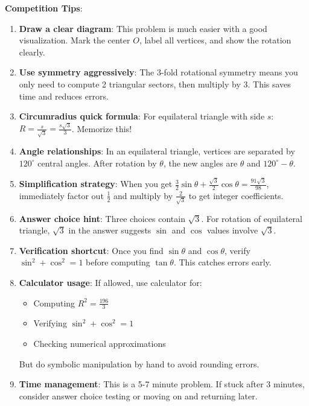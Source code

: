 \documentclass[12pt]{article}
\begin{document}
\begin{tipbox}
\textbf{Competition Tips}:

\begin{enumerate}
    \item \textbf{Draw a clear diagram}: This problem is much easier with a good visualization. Mark the center $O$, label all vertices, and show the rotation clearly.
    
    \item \textbf{Use symmetry aggressively}: The 3-fold rotational symmetry means you only need to compute 2 triangular sectors, then multiply by 3. This saves time and reduces errors.
    
    \item \textbf{Circumradius quick formula}: For equilateral triangle with side $s$: $R = \frac{s}{\sqrt{3}} = \frac{s\sqrt{3}}{3}$. Memorize this!
    
    \item \textbf{Angle relationships}: In an equilateral triangle, vertices are separated by $120^{\circ}$ central angles. After rotation by $\theta$, the new angles are $\theta$ and $120^{\circ} - \theta$.
    
    \item \textbf{Simplification strategy}: When you get $\frac{3}{2}\sin\theta + \frac{\sqrt{3}}{2}\cos\theta = \frac{91\sqrt{3}}{98}$, immediately factor out $\frac{1}{2}$ and multiply by $\frac{2}{\sqrt{3}}$ to get integer coefficients.
    
    \item \textbf{Answer choice hint}: Three choices contain $\sqrt{3}$. For rotation of equilateral triangle, $\sqrt{3}$ in the answer suggests $\sin$ and $\cos$ values involve $\sqrt{3}$.
    
    \item \textbf{Verification shortcut}: Once you find $\sin\theta$ and $\cos\theta$, verify $\sin^2 + \cos^2 = 1$ before computing $\tan\theta$. This catches errors early.
    
    \item \textbf{Calculator usage}: If allowed, use calculator for:
    \begin{itemize}
        \item Computing $R^2 = \frac{196}{3}$
        \item Verifying $\sin^2 + \cos^2 = 1$
        \item Checking numerical approximations
    \end{itemize}
    But do symbolic manipulation by hand to avoid rounding errors.
    
    \item \textbf{Time management}: This is a 5-7 minute problem. If stuck after 3 minutes, consider answer choice testing or moving on and returning later.
\end{enumerate}
\end{tipbox}
\end{document}
